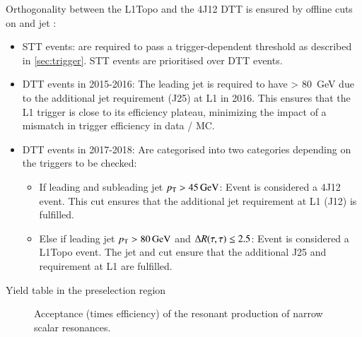 Orthogonality between the L1Topo and the 4J12 DTT is ensured by offline cuts on
\tauhadvis and jet \pT:
\begin{itemize}
\item STT events: \tauhadvis are required to pass a trigger-dependent \pT
  threshold as described in \cref{sec:trigger}. STT events are prioritised over
  DTT events.

\item DTT events in 2015-2016: The leading jet is required to have \pT >
  \SI{80}{\GeV} due to the additional jet requirement (J25) at L1 in 2016. This
  ensures that the L1 trigger is close to its efficiency plateau, minimizing the
  impact of a mismatch in trigger efficiency in data / MC.

\item DTT events in 2017-2018: Are categorised into two categories depending on
  the triggers to be checked:
  \begin{itemize}
  \item If leading and subleading jet $p_{\text{T}} > \SI{45}{\ensuremath{\text{GeV}}}$: Event is considered a
    4J12 event. This cut ensures that the additional jet requirement at L1 (J12)
    is fulfilled.
  \item Else if leading jet $\pT > \SI{80}{\GeV}$ and $\Delta R(\tau, \tau) \leq 2.5$:
    Event is considered a L1Topo event. The jet \pT and \dRtautau cut ensure
    that the additional J25 and \dRtautau requirement at L1 are fulfilled.
  \end{itemize}
\end{itemize}


\begin{table}[htbp]
  \centering
  \caption{Yield table in the \hadhad preselection region}
  \label{tab:hadhad_presel_yields}
\end{table}

\begin{figure}[htbp]
  \centering


  \caption{Acceptance (times efficiency) of the resonant production of narrow scalar resonances.}
  \label{fig:signal_acceptance_resonant}
\end{figure}






